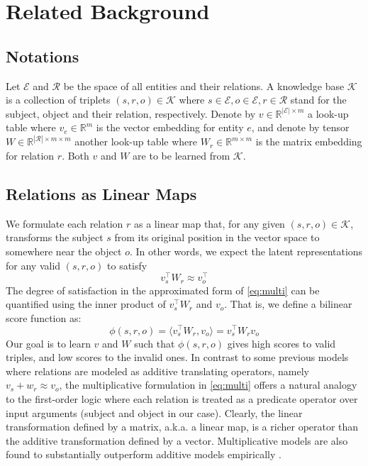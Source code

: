 \documentclass{article}
\begin{document}
 \section{Related Background}
\label{sec:linearmaps}

\subsection{Notations}
Let $\mathcal{E}$ and $\mathcal{R}$ be the space of all entities and their relations.
A knowledge base $\mathcal{K}$ is a collection of triplets $(s, r, o) \in \mathcal{K}$
where $s \in \mathcal{E}, o \in \mathcal{E}, r \in \mathcal{R}$ stand for the subject, object and their relation, respectively.
Denote by $v \in \mathbb{R}^{|\mathcal{E}| \times m}$ a look-up table where $v_e \in \mathbb{R}^m$ is the vector embedding for entity $e$,
and denote by tensor $W \in \mathbb{R}^{|\mathcal{R}| \times m \times m}$ another look-up table where $W_r \in \mathbb{R}^{m \times m}$ is the matrix embedding for relation $r$.
Both $v$ and $W$ are to be learned from $\mathcal{K}$.

\subsection{Relations as Linear Maps}
We formulate each relation $r$ as a linear map that,
for any given $(s, r, o) \in \mathcal{K}$, transforms the subject $s$ from its original position in the vector space to somewhere near the object $o$.
In other words,
we expect the latent representations for any valid $(s, r, o)$ to satisfy
\begin{equation}
    v_s^\top W_r \approx v_o^\top
    \label{eq:multi}
\end{equation}
The degree of satisfaction in the approximated form of  \eqref{eq:multi} can be quantified using
the inner product of $v_s^\top W_r$ and $v_o$.
That is, we define a bilinear score function as:
\begin{equation}
    \phi(s,r,o) = \langle v_s^\top W_r, v_o \rangle = v_s^\top W_r v_o
\end{equation}
Our goal is to learn $v$ and $W$ such that
$\phi(s, r, o)$ gives high scores to valid triples, and low scores to the invalid ones. 
In contrast to some previous models \cite{bordes2013translating}
where relations are modeled as additive translating operators,
namely $v_s + w_r \approx v_o$,
the multiplicative formulation in \eqref{eq:multi} offers a natural analogy to the first-order logic where each relation is treated as a predicate operator over input arguments (subject and object in our case).  Clearly, the linear transformation defined by a matrix, a.k.a. a linear map, is a richer operator than the additive transformation defined by a vector.
Multiplicative models are also found to substantially outperform additive models
empirically \cite{nickel2011three, DBLP:journals/corr/YangYHGD14a}.
\end{document}
